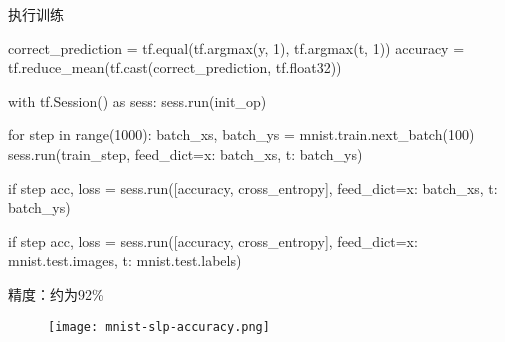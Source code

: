 \begin{frame}[fragile]{执行训练}
\begin{python}
correct_prediction = tf.equal(tf.argmax(y, 1), tf.argmax(t, 1))
accuracy = tf.reduce_mean(tf.cast(correct_prediction, tf.float32))

with tf.Session() as sess:
  sess.run(init_op)

  for step in range(1000):
    batch_xs, batch_ys = mnist.train.next_batch(100)        
    sess.run(train_step, feed_dict={x: batch_xs, t: batch_ys})

    if step %
      acc, loss = sess.run([accuracy, cross_entropy], 
        feed_dict={x: batch_xs, t: batch_ys})
    
    if step %
      acc, loss = sess.run([accuracy, cross_entropy], 
        feed_dict={x: mnist.test.images, t: mnist.test.labels}) 
\end{python}
\end{frame}

\begin{frame}[fragile]{精度：约为92\%}
  \begin{figure}
    \centering
    \texttt{[image: mnist-slp-accuracy.png]}
  \end{figure}
\end{frame}



